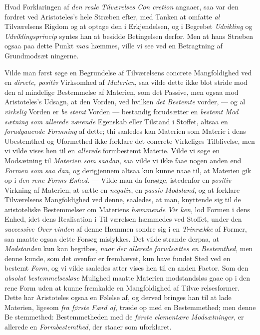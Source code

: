 Hvad Forklaringen af \emph{den reale Tilværelses Con\-%
cretion} angaaer, saa var den fordret ved Aristoteles's hele
Stræben efter, med Tanken at omfatte \emph{al} Tilværelsens Rigdom
og at optage den i Erkjendelsen, og i Begrebet \emph{Udvikling}
og \emph{Udviklingsprincip} syntes han at besidde Betingelsen
derfor. Men at hans Stræben ogsaa paa dette Punkt \emph{maa}
hæmmes, ville vi see ved en Betragtning af Grundmodsæt\-%
ningerne.

Vilde man først søge en Begrundelse af Tilværelsens
concrete Mangfoldighed ved en \emph{directe, positiv} Virksomhed
af \emph{Materien}, saa vilde dette ikke blot stride mod den al\-%
mindelige Bestemmelse af Materien, som det Passive, men
ogsaa mod Aristoteles's Udsagn, at den Vorden, ved hvilken
\emph{det Bestemte} vorder, --- og al \emph{virkelig} Vorden er \emph{be\-%
stemt} Vorden --- bestandig forudsætter en \emph{bestemt Mod\-%
sætning som allerede værende} Egenskab eller Tilstand
i Stoffet, altsaa en \emph{forudgaaende Formning} af dette; thi
saaledes kan Materien som Materie i dens Ubestemthed og
Uformethed ikke forklare det concrete Virkeliges Tilblivelse,
men vi vilde vises hen til en \emph{allerede} formbestemt Materie.
Vilde vi søge en Modsætning til \emph{Materien som saadan},
saa vilde vi ikke faae nogen anden end \emph{Formen som saa\-%
dan}, og derigjennem altsaa kun kunne naae til, at Materien
gik op i \emph{den rene Forms Enhed}. --- Vilde man da forsøge,
istedenfor en \emph{positiv} Virkning af Materien, at sætte en
\emph{negativ}, en \emph{passiv Modstand}, og at forklare Tilværelsens
Mangfoldighed ved denne, saaledes, at man, knyttende sig til
de aristoteliske Bestemmelser om Materiens \emph{hæmmende Vir\-%
ken}, lod Formen i dens Enhed, idet dens Realisation i Til\-%
værelsen hæmmedes ved Stoffet, under den \emph{successive Over\-%
vinden} af denne Hæmmen sondre sig i en \emph{Trinrække} af
Former, saa maatte ogsaa dette Forsøg mislykkes. Det vilde
strande derpaa, at \emph{Modstanden} kun kan begribes, \emph{naar
der allerede forudsættes en Bestemthed}, men denne
kunde, som det ovenfor er fremhævet, kun have fundet Sted
ved en bestemt \emph{Form}, og vi vilde saaledes atter vises hen
til en anden Factor. Som den \emph{absolut bestemmelsesløse}
Mulighed maatte Materien modstandsløs gaae op i den rene
Form uden at kunne fremkalde en Mangfoldighed af Tilvæ\-%
relsesformer. Dette har Aristoteles ogsaa en Følelse af, og
derved bringes han til at lade Materien, ligesom \emph{fra første
 \setcounter{footnote}{0}
Færd af}, træde op med en Bestemmethed; men denne Be\-%
stemmethed: Bestemmetheden med de \emph{første elementære
Modsætninger}, er allerede en \emph{Formbestemthed}, der
staaer som uforklaret.

